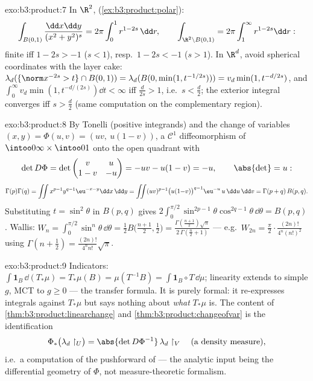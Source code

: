 \begin{solution}{exo:b3:product:7}
In $\R^2$,  (\cref{ex:b3:product:polar}):
\[
\int_{B(0,1)}\frac{\dd x\dd y}{(x^2+y^2)^s}
= 2\pi\int_0^1 r^{1 - 2s}\,\dd r,
\qquad
\int_{\R^2\setminus B(0,1)} = 2\pi\int_1^\infty r^{1-2s}\dd r:
\]
finite iff $1 - 2s > -1$ ($s < 1$), resp.\ $1 - 2s < -1$ ($s >
1$). In $\R^d$, avoid spherical coordinates with the layer
cake: $\lambda_d(\{\norm x^{-2s} > t\}\cap B(0,1)) =
\lambda_d(B(0, \min(1, t^{-1/2s}))) = v_d\min(1, t^{-d/2s})$,
and $\int_0^\infty v_d\min(1, t^{-d/(2s)})\dd t < \infty$ iff
$\frac d{2s} > 1$, i.e.\ $s < \frac d2$; the exterior integral
converges iff $s > \frac d2$ (same computation on the
complementary region).
\end{solution}

\begin{solution}{exo:b3:product:8}
By Tonelli (positive integrands) and the change of variables
$(x, y) = \Phi(u, v) = (uv,\ u(1-v))$, a $\mathcal C^1$
diffeomorphism of $\intoo0\infty\times\intoo01$ onto the open
quadrant with
\[
\det D\Phi = \det\begin{pmatrix} v & u\\ 1 - v & -u
\end{pmatrix} = -uv - u(1 - v) = -u,
\qquad \abs{\det} = u :
\]
\[
\Gamma(p)\Gamma(q) =
\iint x^{p-1}y^{q-1}\eu^{-x-y}\dd x\,\dd y
= \iint (uv)^{p-1}\bigl(u(1{-}v)\bigr)^{q-1}\eu^{-u}\,u\,
\dd u\,\dd v
= \Gamma(p + q)\,B(p, q).
\]
Substituting $t = \sin^2\theta$ in $B(p,q)$ gives
$2\int_0^{\pi/2}\sin^{2p-1}\theta\cos^{2q-1}\theta\,\dd\theta =
B(p, q)$. Wallis: $W_n =
\int_0^{\pi/2}\sin^n\theta\,\dd\theta = \frac12B\bigl(\frac{n +
1}2, \frac12\bigr) = \frac{\Gamma(\frac{n+1}2)\sqrt\pi}
{2\,\Gamma(\frac n2 + 1)}$ --- e.g.\ $W_{2n} =
\frac\pi2\cdot\frac{(2n)!}{4^n(n!)^2}$ using
$\Gamma(n + \frac12) = \frac{(2n)!}{4^nn!}\sqrt\pi$.
\end{solution}

\begin{solution}{exo:b3:product:9}
Indicators: $\int\mathbf 1_B\,\dd(T_*\mu) = T_*\mu(B) =
\mu(T^{-1}B) = \int\mathbf 1_B\circ T\,\dd\mu$; linearity
extends to simple $g$, MCT to $g \geq 0$ --- the transfer
formula. It is purely formal: it re-expresses integrals against
$T_*\mu$ but says nothing about \emph{what} $T_*\mu$ is. The
content of \cref{thm:b3:product:linearchange} and
\cref{thm:b3:product:changeofvar} is the identification
\[
\Phi_*\bigl(\lambda_d\restriction_U\bigr) =
\abs{\det D\Phi^{-1}}\,\lambda_d\restriction_V
\quad\text{(a density measure)},
\]
i.e.\ a computation of the pushforward of  ---
the analytic input being the differential geometry of $\Phi$,
not measure-theoretic formalism.
\end{solution}

